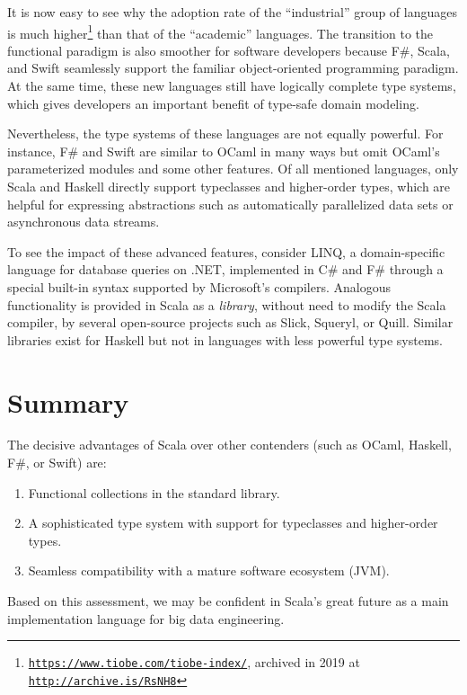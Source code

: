 It is now easy to see why the adoption rate of the \textsf{``}industrial\textsf{''}
group of languages is much higher\footnote{\texttt{\href{https://www.tiobe.com/tiobe-index/}{https://www.tiobe.com/tiobe-index/}},
archived in 2019 at \texttt{\href{http://archive.is/RsNH8}{http://archive.is/RsNH8}}} than that of the \textsf{``}academic\textsf{''} languages. The transition to the
functional paradigm is also smoother for software developers because
F\#, Scala, and Swift seamlessly support the familiar object-oriented
programming paradigm. At the same time, these new languages still
have logically complete type systems, which gives developers an important
benefit of type-safe domain modeling.

Nevertheless, the type systems of these languages are not equally
powerful. For instance, F\# and Swift are similar to OCaml in many
ways but omit OCaml\textsf{'}s parameterized modules and some other features.
Of all mentioned languages, only Scala and Haskell directly support
typeclasses and higher-order types, which are helpful for expressing
abstractions such as automatically parallelized data sets or asynchronous
data streams.

To see the impact of these advanced features, consider LINQ, a domain-specific
language for database queries on .NET, implemented in C\# and F\#
through a special built-in syntax supported by Microsoft\textsf{'}s compilers.
Analogous functionality is provided in Scala as a \emph{library},
without need to modify the Scala compiler, by several open-source
projects such as Slick, Squeryl, or Quill. Similar libraries exist
for Haskell \textemdash{} but not in languages with less powerful
type systems.

\section{Summary}

The decisive advantages of Scala over other contenders (such as OCaml,
Haskell, F\#, or Swift) are:
\begin{enumerate}
\item Functional collections in the standard library.
\item A sophisticated type system with support for typeclasses and higher-order
types.
\item Seamless compatibility with a mature software ecosystem (JVM).
\end{enumerate}
Based on this assessment, we may be confident in Scala\textsf{'}s great future
as a main implementation language for big data engineering. 
